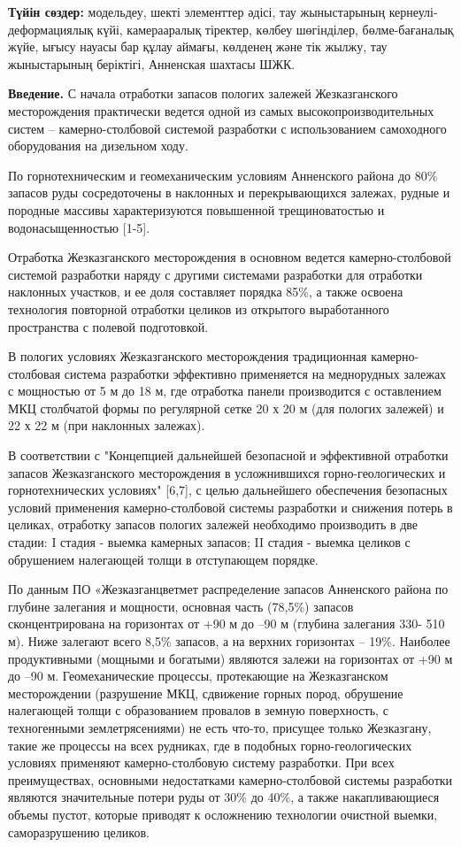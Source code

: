 {\bfseries Түйін сөздер:} модельдеу, шекті элементтер әдісі, тау
жыныстарының кернеулі-деформациялық күйі, камерааралық тіректер, көлбеу
шөгінділер, бөлме-бағаналық жүйе, ығысу науасы бар құлау аймағы,
көлденең және тік жылжу, тау жыныстарының беріктігі, Анненская шахтасы
ШЖК.
\begin{multicols}{2}

{\bfseries Введение.} С начала отработки запасов пологих залежей
Жезказганского месторождения практически ведется одной из самых
высокопроизводительных систем -- камерно-столбовой системой разработки с
использованием самоходного оборудования на дизельном ходу.

По горнотехническим и геомеханическим условиям Анненского района до 80\%
запасов руды сосредоточены в наклонных и перекрывающихся залежах, рудные
и породные массивы характеризуются повышенной трещиноватостью и
водонасыщенностью {[}1-5{]}.

Отработка Жезказганского месторождения в основном ведется
камерно-столбовой системой разработки наряду с другими системами
разработки для отработки наклонных участков, и ее доля составляет
порядка 85\%, а также освоена технология повторной отработки целиков из
открытого выработанного пространства с полевой подготовкой.

В пологих условиях Жезказганского месторождения традиционная
камерно-столбовая система разработки эффективно применяется на
меднорудных залежах с мощностью от 5 м до 18 м, где отработка панели
производится с оставлением МКЦ столбчатой формы по регулярной сетке 20 х
20 м (для пологих залежей) и 22 х 22 м (при наклонных залежах).

В соответствии с "Концепцией дальнейшей безопасной и эффективной
отработки запасов Жезказганского месторождения в усложнившихся
горно-геологических и горнотехнических условиях" {[}6,7{]}, с целью
дальнейшего обеспечения безопасных условий применения камерно-столбовой
системы разработки и снижения потерь в целиках, отработку запасов
пологих залежей необходимо производить в две стадии: I стадия - выемка
камерных запасов; II стадия - выемка целиков с обрушением налегающей
толщи в отступающем порядке.

По данным ПО «Жезказганцветмет распределение запасов Анненского района
по глубине залегания и мощности, основная часть (78,5\%) запасов
сконцентрирована на горизонтах от +90 м до --90 м (глубина залегания
330- 510 м). Ниже залегают всего 8,5\% запасов, а на верхних горизонтах
-- 19\%. Наиболее продуктивными (мощными и богатыми) являются залежи на
горизонтах от +90 м до --90 м. Геомеханические процессы, протекающие на
Жезказганском месторождении (разрушение МКЦ, сдвижение горных пород,
обрушение налегающей толщи с образованием провалов в земную поверхность,
с техногенными землетрясениями) не есть что-то, присущее только
Жезказгану, такие же процессы на всех рудниках, где в подобных
горно-геологических условиях применяют камерно-столбовую систему
разработки. При всех преимуществах, основными недостатками
камерно-столбовой системы разработки являются значительные потери руды
от 30\% до 40\%, а также накапливающиеся объемы пустот, которые приводят
к осложнению технологии очистной выемки, саморазрушению целиков. 


\end{multicols}

